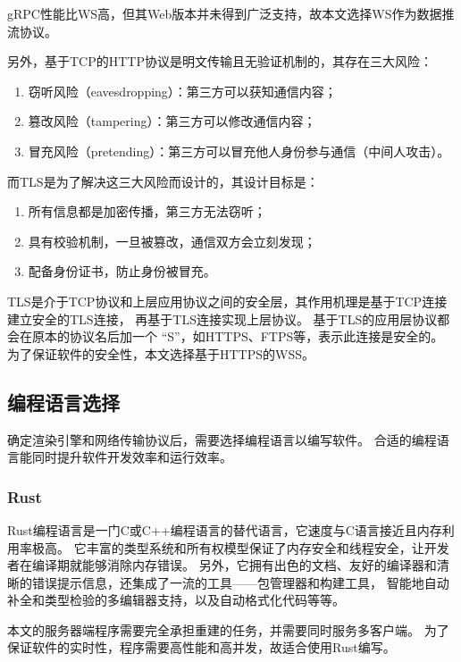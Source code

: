 gRPC性能比WS高，但其Web版本并未得到广泛支持，故本文选择WS作为数据推流协议。

另外，基于TCP的HTTP协议是明文传输且无验证机制的，其存在三大风险：
\begin{enumerate}
    \item 窃听风险（eavesdropping）：第三方可以获知通信内容；
    \item 篡改风险（tampering）：第三方可以修改通信内容；
    \item 冒充风险（pretending）：第三方可以冒充他人身份参与通信（中间人攻击）。
\end{enumerate}

而TLS是为了解决这三大风险而设计的，其设计目标是：

\begin{enumerate}
    \item 所有信息都是加密传播，第三方无法窃听；
    \item 具有校验机制，一旦被篡改，通信双方会立刻发现；
    \item 配备身份证书，防止身份被冒充。
\end{enumerate}

TLS是介于TCP协议和上层应用协议之间的安全层，其作用机理是基于TCP连接建立安全的TLS连接，
再基于TLS连接实现上层协议。
基于TLS的应用层协议都会在原本的协议名后加一个 “S”，如HTTPS、FTPS等，表示此连接是安全的。
为了保证软件的安全性，本文选择基于HTTPS的WSS。

\subsection{编程语言选择}
\label{sec:programming-language}

确定渲染引擎和网络传输协议后，需要选择编程语言以编写软件。
合适的编程语言能同时提升软件开发效率和运行效率。

\subsubsection{Rust}
Rust编程语言\cite{rust}是一门C或C++编程语言的替代语言，它速度与C语言接近且内存利用率极高。
它丰富的类型系统和所有权模型保证了内存安全和线程安全，让开发者在编译期就能够消除内存错误。
另外，它拥有出色的文档、友好的编译器和清晰的错误提示信息，还集成了一流的工具——包管理器和构建工具，
智能地自动补全和类型检验的多编辑器支持，以及自动格式化代码等等。

本文的服务器端程序需要完全承担重建的任务，并需要同时服务多客户端。
为了保证软件的实时性，程序需要高性能和高并发，故适合使用Rust编写。


